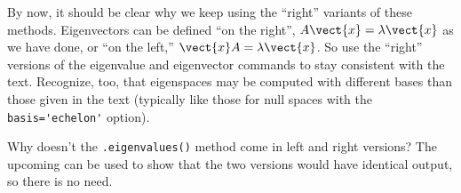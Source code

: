%
By now, it should be clear why we keep using the ``right'' variants of these methods.  Eigenvectors can be defined ``on the right'', $A\vect{x}=\lambda\vect{x}$ as we have done, or ``on the left,''  $\vect{x}A=\lambda\vect{x}$.  So use the ``right'' versions of the eigenvalue and eigenvector commands to stay consistent with the text.  Recognize, too, that eigenspaces may be computed with different bases than those given in the text (typically like those for null spaces with the \verb!basis='echelon'! option).\par
%
Why doesn't the \verb?.eigenvalues()? method come in left and right versions?  The upcoming  can be used to show that the two versions would have identical output, so there is no need.
